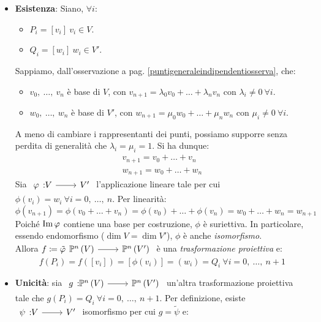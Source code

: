 \begin{demonstration}
	\begin{itemize}
		\item \textbf{Esistenza}: Siano, $\forall i$:
		\begin{itemize}
			\item $P_i=\left[v_i\right]\ v_i\in V$.
			\item $Q_i=\left[w_i\right]\ w_i\in V'$.
		\end{itemize}
	Sappiamo, dall'osservazione a pag. \ref{puntigeneraleindipendentiosserva}, che:
	\begin{itemize}
		\item $v_0,\ \ldots,\ v_n$ è base di $V$, con $v_{n+1}=\lambda_0v_0+\ldots+\lambda_n v_n$ con $\lambda_i\neq 0\ \forall i$.
		\item $w_0,\ \ldots,\ w_n$ è base di $V'$, con $w_{n+1}=\mu_0w_0+\ldots+\mu_n w_n$ con $\mu_i\neq 0\ \forall i$.
	\end{itemize}
		A meno di cambiare i rappresentanti dei punti, possiamo supporre senza perdita di generalità che $\lambda_i=\mu_i=1$. Si ha dunque:
		\begin{gather*}
			v_{n+1}=v_0+\ldots+v_n\\
			w_{n+1}=w_0+\ldots+w_n
		\end{gather*}
	Sia $\funz{\phi}{V}{V'}$ l'applicazione lineare tale per cui $\phi\left(v_i\right)=w_i\ \forall i=0,\ \ldots,\ n$. Per linearità:
	\begin{equation*}
		\phi\left(v_{n+1}\right)=\phi\left(v_0+\ldots+v_n\right)=\phi\left(v_0\right)+\ldots+\phi\left(v_n\right)=w_0+\ldots+w_n=w_{n+1}
	\end{equation*}
Poiché $\operatorname{Im} \varphi$ contiene una base per costruzione, $\phi$ è suriettiva. In particolare, essendo endomorfismo ($\dim V=\dim V'$), $\phi$ è anche \textit{isomorfismo}.\\
Allora $f\coloneqq\tilde{\phi}\funz{\ }{\proj{V}}{\proj{V'}}$ è una \textit{trasformazione proiettiva} e:
\begin{equation*}
	f\left(P_i\right)=f\left(\left[v_i\right]\right)=\left[\phi\left(v_i\right)\right]=\left(w_i\right)=Q_i\ \forall i=0,\ \ldots,\ n+1
\end{equation*}
\item \textbf{Unicità}: sia $\funz{g}{\proj{V}}{\proj{V'}}$ un'altra trasformazione proiettiva tale che $g\left(P_i\right)=Q_i\ \forall i=0,\ \ldots,\ n+1$. Per definizione, esiste $\funz{\psi}{V}{V'}$ isomorfismo per cui $g=\tilde{\psi}$ e:
\begin{equation*}

\end{equation*}
\end{itemize}
\end{demonstration}
